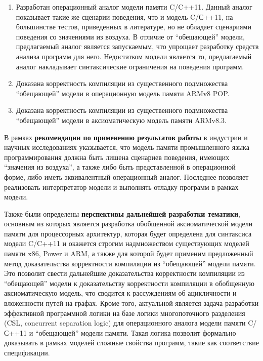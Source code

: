 \begin{enumerate}
  \item Разработан операционный аналог модели памяти C/C++11.
    Данный аналог показывает такие же сценарии поведения, что и модель C/С++11, на большинстве
    тестов, приведенных в литературе, но не обладает сценариями поведения со значениями из воздуха.
    В отличие от ``обещающей'' модели, предлагаемый аналог является запускаемым, что упрощает
    разработку средств анализа программ для него. Недостатком модели является то,
    предлагаемый аналог накладывает синтаксические ограничения на поведения программ.
  \item Доказана корректность компиляции из существенного подмножества ``обещающей'' модели в операционную модель
    памяти ARMv8 POP.
  \item Доказана корректность компиляции из существенного подмножества ``обещающей'' модели в
    аксиоматическую модель памяти ARMv8.3.
\end{enumerate}

В рамках \textbf{рекомендации по применению результатов работы} в индустрии и научных исследованиях указывается,
что модель памяти промышленного языка программирования должна быть лишена сценариев поведения, имеющих ``значения из воздуха'',
а также либо быть представленной в операционной форме, либо иметь эквивалентный операционный аналог.
Последнее позволяет реализовать интерпретатор модели и выполнять отладку программ в рамках модели.

Также были определены \textbf{перспективы дальнейшей разработки тематики}, основным из которых является
разработка обобщенной аксиоматической модели памяти для процессорных архитектур, которая будет
определена для синтаксиса модели C/C++11 и окажется строгим надмножеством существующих моделей памяти
x86, Power и ARM, а также для которой будет применим предложенный метод доказательства корректности компиляции
из ``обещающей'' модели памяти. Это позволит свести дальнейшие доказательства корректности компиляции из
``обещающей'' модели к доказательству корректности компиляции в обобщенную аксиоматическую модель, что
сводится к рассуждениям об ацикличности и вложенности путей на графах.
Кроме того, актуальной является задача разработки эффективной программной логики на базе логики многопоточного разделения
(CSL, concurrent separation logic) для операционного аналога модели памяти C/С++11 и ``обещающей'' модели памяти.
Такая логика позволит формально доказывать  в рамках моделей сложные свойства программ, такие как соответствие спецификации.
